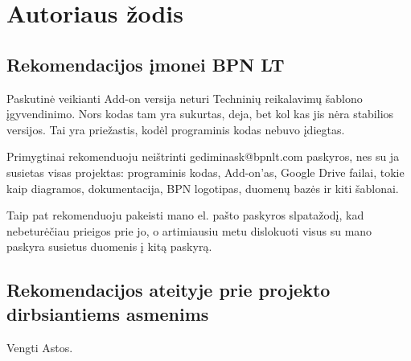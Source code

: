 

\pagebreak
\section{Autoriaus žodis}
\subsection{Rekomendacijos įmonei BPN LT}

Paskutinė veikianti Add-on versija neturi Techninių reikalavimų šablono įgyvendinimo. Nors kodas tam yra sukurtas, deja, bet kol kas jis nėra stabilios versijos. Tai yra priežastis, kodėl programinis kodas nebuvo įdiegtas.

Primygtinai rekomenduoju neištrinti gediminask@bpnlt.com paskyros, nes su ja susietas visas projektas: programinis kodas, Add-on'as, Google Drive failai, tokie kaip diagramos, dokumentacija, BPN logotipas, duomenų bazės ir kiti šablonai.

Taip pat rekomenduoju pakeisti mano el. pašto paskyros slpatažodį, kad nebeturėčiau prieigos prie jo, o artimiausiu metu dislokuoti visus su mano paskyra susietus duomenis į kitą paskyrą.

\subsection{Rekomendacijos ateityje prie projekto dirbsiantiems asmenims}

Vengti Astos.


